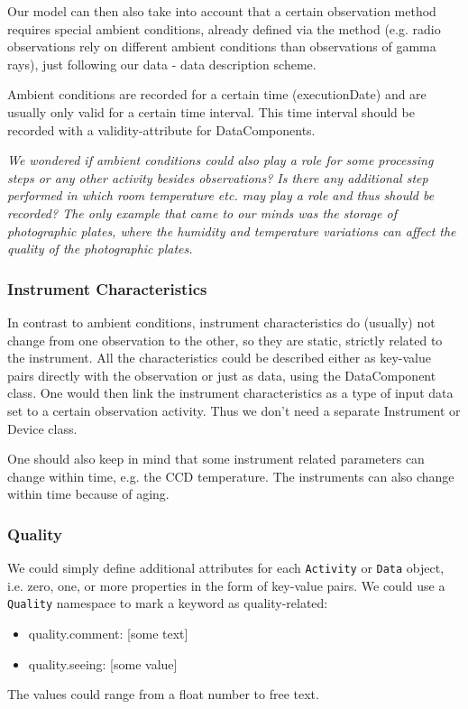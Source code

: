 \documentclass[11pt,a4paper]{ivoa}
\begin{document}
Our model can then also take into account that a certain observation
method requires special ambient conditions, already defined via the method
(e.g. radio observations rely on different ambient conditions than observations
of gamma rays), just following our data - data description scheme.


Ambient conditions are recorded for a certain time (executionDate) and are
usually only valid for a certain time interval. This time interval should be recorded
with a validity-attribute for DataComponents.


\emph{We wondered if ambient conditions could also play a role for some
processing steps or any other activity besides observations? Is there any
additional step performed in which room temperature etc. may play a role and thus
should be recorded? The only example that came to our minds was the storage of
photographic plates, where the humidity and temperature variations can affect the
quality of the photographic plates.}



\subsubsection{Instrument Characteristics}
In contrast to ambient conditions, instrument characteristics do (usually) not
change from one observation to the other, so they are static, strictly related to
the instrument. 
All the characteristics could be described either as key-value pairs directly with the 
observation or just as data, using the DataComponent class. One would then 
link the instrument characteristics as a type of input data set to a certain 
observation activity. Thus we don't need a separate Instrument or Device class.



One should also keep in mind that some instrument related parameters can change within time,
e.g. the CCD temperature. The instruments can also change within time because of aging.


\subsubsection{Quality}
We could simply define additional attributes for each \texttt{Activity}
or \texttt{Data} object, i.e. zero, one, or more properties in the form of
key-value pairs. We could use a \texttt{Quality} namespace to mark a keyword
as quality-related:
\begin{itemize}
	\item quality.comment: [some text]
	\item quality.seeing: [some value]
\end{itemize}
The values could range from a float number to free text.
\end{document}
